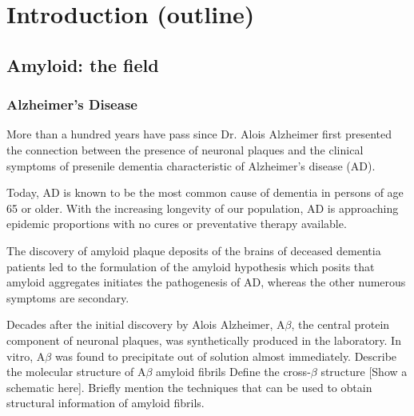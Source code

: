 \chapter{Introduction (outline)}

\section{Amyloid: the field} %


\subsection{Alzheimer's Disease}
\begin{outline}[enumerate]
	\1 More than a hundred years have pass since Dr. Alois Alzheimer first presented the connection between the presence of neuronal plaques and the clinical symptoms of presenile dementia characteristic of Alzheimer's disease (AD).

	\1 Today, AD is known to be the most common cause of dementia in persons of age 65 or older. With the increasing longevity of our population, AD is approaching epidemic proportions with no cures or preventative therapy available.\cite{Blennow:2006wd}

	\1 The discovery of amyloid plaque deposits of the brains of deceased dementia patients led to the formulation of the amyloid hypothesis which posits that amyloid aggregates initiates the pathogenesis of AD, whereas the other numerous symptoms are secondary.

	\1 Decades after the initial discovery by Alois Alzheimer, A$\beta$, the central protein component of neuronal plaques, was synthetically produced in the laboratory. In vitro, A$\beta$ was found to precipitate out of solution almost immediately. 
		\2 Describe the molecular structure of A$\beta$ amyloid fibrils
			\3 Define the cross-$\beta$ structure [Show a schematic here].
		\2 Briefly mention the techniques that can be used to obtain structural information of amyloid fibrils.

\end{outline}


